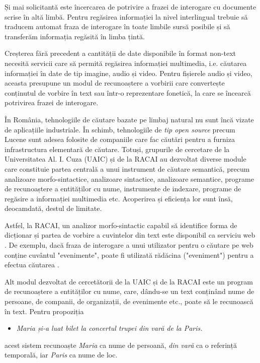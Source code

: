 \documentclass[]{../../metanetpaper}
\begin{document}
\begin{multicols}{2}
Și mai solicitantă este încercarea de potrivire a frazei de interogare cu documente scrise în altă limbă. Pentru regăsirea informației la nivel interlingual trebuie să traducem automat fraza de interogare în toate limbile sursă posibile și să transferăm informația regăsită în limba țintă. 

Creșterea fără precedent a cantității de date disponibile în format non-text necesită servicii care să permită regăsirea informației multimedia, i.e. căutarea informației în date de tip imagine, audio și video. Pentru fișierele audio și video, aceasta presupune un modul de recunoaștere a vorbirii care convertește conținutul de vorbire în text sau într-o reprezentare fonetică, la care se încearcă potrivirea frazei de interogare.

În România, tehnologiile de căutare bazate pe limbaj natural nu sunt încă vizate de aplicațiile industriale. În schimb, tehnologiile de \textit{tip open source} precum Lucene sunt adesea folosite de companiile care fac căutări pentru a furniza infrastructura elementară de căutare. Totuși, grupurile de cercetare de la Universitatea Al. I. Cuza (UAIC) și de la RACAI au dezvoltat diverse module care constituie partea centrală a unui instrument de căutare semantică, precum analizoare morfo-sintactice, analizoare sintactice, analizoare semantice, programe de recunoaștere a entităților cu nume, instrumente de indexare, programe de regăsire a informației multimedia etc. Acoperirea și eficiența lor sunt însă, deocamdată,  destul de limitate.

Astfel, la RACAI, un analizor morfo-sintactic capabil să identifice forma de dicționar și partea de vorbire a cuvintelor din text este disponibil ca serviciu web \cite{webservicesUrl}. De exemplu, dacă fraza de interogare a unui utilizator pentru o căutare pe web conține cuvântul "evenimente", poate fi utilizată rădăcina ("eveniment") pentru a efectua căutarea \cite{webservicesArt}.

Alt modul dezvoltat de cercetătorii de la UAIC și de la RACAI este un program de recunoaștere a entităților cu nume, care, dându-se un text conținând nume de persoane, de companii, de organizații, de evenimente etc., poate să le recunoască în text. Pentru propoziția 

\begin{itemize}
\item\textit{Maria și-a luat bilet la concertul trupei din vară de la Paris.}
\end{itemize}

\noindent acest sistem recunoaște \textit{Maria} ca nume de persoană, \textit{din vară} ca o referință temporală, iar \textit{Paris} ca nume de loc.


\end{multicols}
\end{document}
